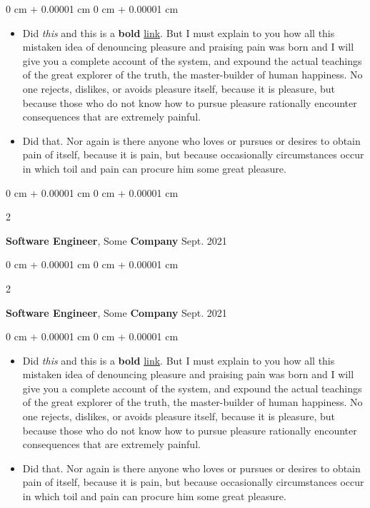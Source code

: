 \documentclass[10pt, letterpaper]{article}
\newenvironment{highlights}{
    \begin{itemize}[
        topsep=0.10 cm,
        parsep=0.10 cm,
        partopsep=0pt,
        itemsep=0pt,
        leftmargin=0 cm + 10pt
    ]
}{
    \end{itemize}
} %
\newenvironment{onecolentry}{
    \begin{adjustwidth}{
        0 cm + 0.00001 cm
    }{
        0 cm + 0.00001 cm
    }
}{
    \end{adjustwidth}
} %
\newenvironment{twocolentry}[2][]{
    \onecolentry
    \def\secondColumn{#2}
    \setcolumnwidth{\fill, 4.5 cm}
    \begin{paracol}{2}
}{
    \switchcolumn \raggedleft \secondColumn
    \end{paracol}
    \endonecolentry
} %
\begin{document}
        \vspace{0.10 cm}
        \begin{onecolentry}
            \begin{highlights}
                \item Did \textit{this} and this is a \textbf{bold} \href{https://example.com}{link}. But I must explain to you how all this mistaken idea of denouncing pleasure and praising pain was born and I will give you a complete account of the system, and expound the actual teachings of the great explorer of the truth, the master-builder of human happiness. No one rejects, dislikes, or avoids pleasure itself, because it is pleasure, but because those who do not know how to pursue pleasure rationally encounter consequences that are extremely painful.
                \item Did that. Nor again is there anyone who loves or pursues or desires to obtain pain of itself, because it is pain, but because occasionally circumstances occur in which toil and pain can procure him some great pleasure.
            \end{highlights}
        \end{onecolentry}


        \vspace{0.2 cm}

        \begin{twocolentry}{
            Sept. 2021
        }
            \textbf{Software Engineer}, Some \textbf{Company}\end{twocolentry}



        \vspace{0.2 cm}

        \begin{twocolentry}{
            Sept. 2021
        }
            \textbf{Software Engineer}, Some \textbf{Company}\end{twocolentry}

        \vspace{0.10 cm}
        \begin{onecolentry}
            \begin{highlights}
                \item Did \textit{this} and this is a \textbf{bold} \href{https://example.com}{link}. But I must explain to you how all this mistaken idea of denouncing pleasure and praising pain was born and I will give you a complete account of the system, and expound the actual teachings of the great explorer of the truth, the master-builder of human happiness. No one rejects, dislikes, or avoids pleasure itself, because it is pleasure, but because those who do not know how to pursue pleasure rationally encounter consequences that are extremely painful.
                \item Did that. Nor again is there anyone who loves or pursues or desires to obtain pain of itself, because it is pain, but because occasionally circumstances occur in which toil and pain can procure him some great pleasure.
            \end{highlights}
        \end{onecolentry}
\end{document}
